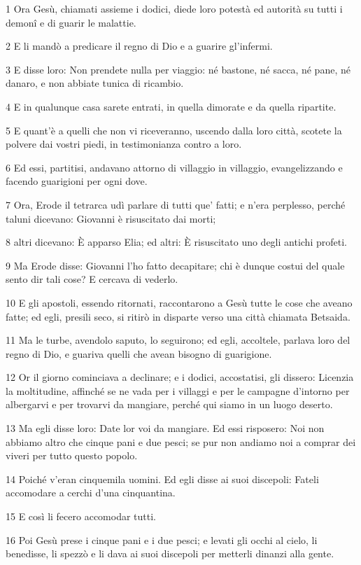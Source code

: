 \par 1 Ora Gesù, chiamati assieme i dodici, diede loro potestà ed autorità su tutti i demonî e di guarir le malattie.
\par 2 E li mandò a predicare il regno di Dio e a guarire gl'infermi.
\par 3 E disse loro: Non prendete nulla per viaggio: né bastone, né sacca, né pane, né danaro, e non abbiate tunica di ricambio.
\par 4 E in qualunque casa sarete entrati, in quella dimorate e da quella ripartite.
\par 5 E quant'è a quelli che non vi riceveranno, uscendo dalla loro città, scotete la polvere dai vostri piedi, in testimonianza contro a loro.
\par 6 Ed essi, partitisi, andavano attorno di villaggio in villaggio, evangelizzando e facendo guarigioni per ogni dove.
\par 7 Ora, Erode il tetrarca udì parlare di tutti que' fatti; e n'era perplesso, perché taluni dicevano: Giovanni è risuscitato dai morti;
\par 8 altri dicevano: È apparso Elia; ed altri: È risuscitato uno degli antichi profeti.
\par 9 Ma Erode disse: Giovanni l'ho fatto decapitare; chi è dunque costui del quale sento dir tali cose? E cercava di vederlo.
\par 10 E gli apostoli, essendo ritornati, raccontarono a Gesù tutte le cose che aveano fatte; ed egli, presili seco, si ritirò in disparte verso una città chiamata Betsaida.
\par 11 Ma le turbe, avendolo saputo, lo seguirono; ed egli, accoltele, parlava loro del regno di Dio, e guariva quelli che avean bisogno di guarigione.
\par 12 Or il giorno cominciava a declinare; e i dodici, accostatisi, gli dissero: Licenzia la moltitudine, affinché se ne vada per i villaggi e per le campagne d'intorno per albergarvi e per trovarvi da mangiare, perché qui siamo in un luogo deserto.
\par 13 Ma egli disse loro: Date lor voi da mangiare. Ed essi risposero: Noi non abbiamo altro che cinque pani e due pesci; se pur non andiamo noi a comprar dei viveri per tutto questo popolo.
\par 14 Poiché v'eran cinquemila uomini. Ed egli disse ai suoi discepoli: Fateli accomodare a cerchi d'una cinquantina.
\par 15 E così li fecero accomodar tutti.
\par 16 Poi Gesù prese i cinque pani e i due pesci; e levati gli occhi al cielo, li benedisse, li spezzò e li dava ai suoi discepoli per metterli dinanzi alla gente.
